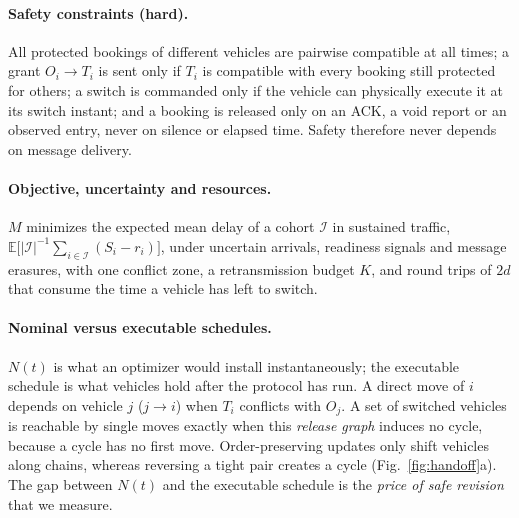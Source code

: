 \documentclass[10pt]{article}
\newcommand{\E}{\mathbb{E}}
\begin{document}
\paragraph{Safety constraints (hard).} All protected bookings of different vehicles are pairwise compatible at all times; a grant $O_i\to T_i$ is sent only if $T_i$ is compatible with every booking still protected for others; a switch is commanded only if the vehicle can physically execute it at its switch instant; and a booking is released only on an ACK, a void report or an observed entry, never on silence or elapsed time. Safety therefore never depends on message delivery.

\paragraph{Objective, uncertainty and resources.} $M$ minimizes the expected mean delay of a cohort $\mathcal I$ in sustained traffic, $\E\big[|\mathcal I|^{-1}\sum_{i\in\mathcal I}(S_i-r_i)\big]$, under uncertain arrivals, readiness signals and message erasures, with one conflict zone, a retransmission budget $K$, and round trips of $2d$ that consume the time a vehicle has left to switch.

\paragraph{Nominal versus executable schedules.} $N(t)$ is what an optimizer would install instantaneously; the executable schedule is what vehicles hold after the protocol has run. A direct move of $i$ depends on vehicle $j$ ($j\to i$) when $T_i$ conflicts with $O_j$. A set of switched vehicles is reachable by single moves exactly when this \emph{release graph} induces no cycle, because a cycle has no first move. Order-preserving updates only shift vehicles along chains, whereas reversing a tight pair creates a cycle (Fig.~\ref{fig:handoff}a). The gap between $N(t)$ and the executable schedule is the \emph{price of safe revision} that we measure.
\end{document}
